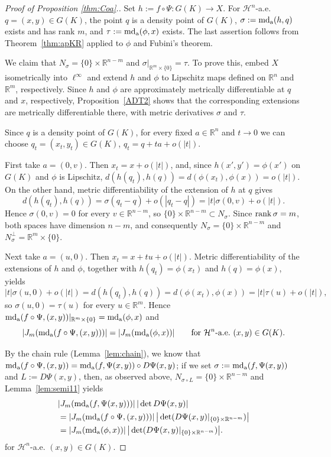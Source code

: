 \documentclass[12pt,leqno]{amsart}
\theoremstyle{definition}
\newcommand{\bbbr}{\mathbb R}
\def\H{{\mathcal H}}
\def\rank{{\rm rank\,}}
\def\apmd{\operatorname{md_{\rm a}}}
\numberwithin{theorem}{section} \numberwithin{equation}{section}
\begin{document}
\begin{proof}[Proof of Proposition \ref{thm:Coa}.]
Set $h:=f\circ\Psi:G(K)\to X$. For $\H^n$-a.e. $q=(x,y)\in G(K)$, the point $q$ is a density point of $G(K)$, $\sigma:=\apmd(h,q)$ exists and has rank $m$, and
$\tau:=\apmd(\phi,x)$ exists. The last assertion follows from Theorem~\ref{thm:apKR} applied to $\phi$ and Fubini's theorem.

We claim that
$N_\sigma=\{0\}\times\bbbr^{n-m}$ and $\sigma|_{\bbbr^m\times\{0\}}=\tau.
$
To prove this, embed $X$ isometrically into $\ell^\infty$ and extend $h$ and $\phi$ to Lipschitz maps defined on $\bbbr^n$ and $\bbbr^m$, respectively. Since $h$ and $\phi$ are approximately metrically differentiable at $q$ and $x$, respectively, Proposition~\ref{ADT2} shows that the corresponding extensions are metrically differentiable there, with metric derivatives $\sigma$ and $\tau$.

Since $q$ is a density point of $G(K)$, for every fixed $a\in\bbbr^n$ and $t\to0$ we can choose $q_t=(x_t,y_t)\in G(K)$, $q_t=q+ta+o(|t|)$.

First take $a=(0,v)$. Then $x_t=x+o(|t|)$, and, since $h(x',y')=\phi(x')$ on $G(K)$ and $\phi$ is Lipschitz,
$d(h(q_t),h(q))=d(\phi(x_t),\phi(x))=o(|t|)$. On the other hand, metric differentiability of the extension of $h$ at $q$ gives
$$
d(h(q_t),h(q))=\sigma(q_t-q)+o(|q_t-q|)
=|t|\sigma(0,v)+o(|t|).
$$
Hence $\sigma(0,v)=0$ for every $v\in\bbbr^{n-m}$, so $
\{0\}\times\bbbr^{n-m}\subset N_\sigma$. Since $\rank\sigma=m$, both spaces have dimension $n-m$, and consequently $N_\sigma=\{0\}\times\bbbr^{n-m}$ and $
N_\sigma^\perp=\bbbr^m\times\{0\}$.

Next take $a=(u,0)$. Then $x_t=x+tu+o(|t|)$. Metric differentiability of the extensions of $h$ and $\phi$, together with $h(q_t)=\phi(x_t)$ and $h(q)=\phi(x)$, yields
$$
|t|\sigma(u,0)+o(|t|)
=d(h(q_t),h(q))
=d(\phi(x_t),\phi(x))
=|t|\tau(u)+o(|t|),
$$
so $\sigma(u,0)=\tau(u)$ for every $u\in\bbbr^m$. Hence
$\apmd(f\circ\Psi,(x,y))|_{\bbbr^m\times\{0\}}=\apmd(\phi,x)$ and 
$$
|J_m(\apmd(f\circ\Psi,(x,y)))|=|J_m(\apmd(\phi,x))|
\qquad
\text{for $\H^n$-a.e.\ }(x,y)\in G(K).
$$

By the chain rule (Lemma~\ref{lem:chain}), we know that $\apmd(f\circ\Psi,(x,y))=\apmd(f,\Psi(x,y))\circ D\Psi(x,y)$; if we set $\sigma:=\apmd(f,\Psi(x,y))$ and $L:=D\Psi(x,y)$, then, as observed above, $N_{\sigma\circ L}=\{0\}\times\bbbr^{n-m}$ and Lemma~\ref{lem:semi11} yields
\begin{equation*}
\begin{split}
&|J_m(\apmd(f,\Psi(x,y)))|\,|\det D\Psi(x,y)|\\
&=|J_m(\apmd(f\circ\Psi,(x,y)))|\,\big|\det (D\Psi(x,y)|_{\{0\}\times\bbbr^{n-m}})\big|\\
&=|J_m(\apmd(\phi,x))|\, \big|\det (D\Psi(x,y)|_{\{0\}\times\bbbr^{n-m}})\big|.
    \end{split}
\end{equation*}
for $\H^n$-a.e. $(x,y)\in G(K)$.



\end{proof}
\end{document}
